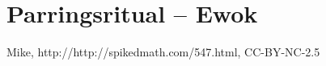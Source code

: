 \documentclass[article,10pt,a4,oneside]{memoir}
\begin{document}
\begin{minipage}[b]{1.95\textwidth}
\begin{minipage}[t]{0.23\linewidth}
\vspace{3mm}
\section*{Parringsritual -- Ewok}

\end{minipage}
\hspace{2mm}
\begin{minipage}[t]{0.46\linewidth}



\begin{center}
\tiny Mike, http://http://spikedmath.com/547.html, CC-BY-NC-2.5
\end{center}
\end{minipage}
\hspace{2mm}
\begin{minipage}[t]{0.23\linewidth}

\vspace{1mm}


\end{minipage}
\end{minipage}
\end{document}
